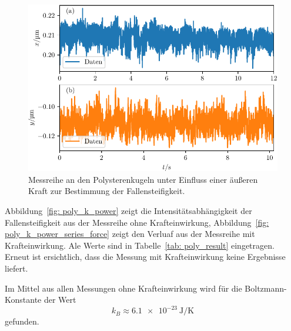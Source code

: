 \begin{figure}
  \centering
  \includegraphics[scale = 1]{../analysis/data/ii_polysteren/70mA/results/with_force_70mA.pdf}
  \caption{Messreihe an den Polysterenkugeln unter Einfluss einer äußeren Kraft zur Bestimmung der Fallensteifigkeit.}
  \label{fig: poly_with_force}
\end{figure}

Abbildung~\ref{fig: poly_k_power} zeigt die Intensitätsabhängigkeit der Fallensteifigkeit aus der Messreihe ohne Krafteinwirkung,
Abbildung~\ref{fig: poly_k_power_series_force} zeigt den Verluaf aus der Messreihe mit Krafteinwirkung. Ale Werte sind in Tabelle~\ref{tab: poly_result}
eingetragen. Erneut ist ersichtlich, dass die Messung mit Krafteinwirkung keine Ergebnisse liefert.

Im Mittel aus allen
Messungen ohne Krafteinwirkung wird für die Boltzmann-Konstante der Wert
\begin{equation}
  k_B \approx \SI{6.1e-23}{\joule\per\kelvin}
\end{equation}
gefunden.

